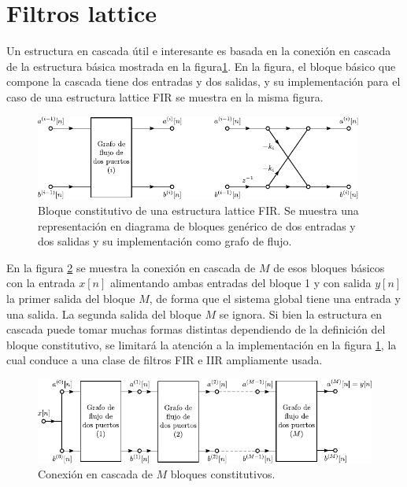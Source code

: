 \documentclass[a4paper]{report}
\begin{document}
\section{Filtros lattice}

Un estructura en cascada útil e interesante es basada en la conexión en cascada de la estructura básica mostrada en la figura\ref{fig:structures_lattice_building_blocks}. En la figura, el bloque básico que compone la cascada tiene dos entradas y dos salidas, y su implementación para el caso de una estructura lattice FIR se muestra en la misma figura.
\begin{figure}[!htb]
 \begin{center}
 \includegraphics[width=0.96\textwidth]{figuras/structures_lattice_building_blocks.pdf}
 \caption{\label{fig:structures_lattice_building_blocks} Bloque constitutivo de una estructura lattice FIR. Se muestra una representación en diagrama de bloques genérico de dos entradas y dos salidas y su implementación como grafo de flujo.}
 \end{center}
\end{figure}
En la figura \ref{fig:structures_lattice_building_blocks_connection} se muestra la conexión en cascada de \(M\) de esos bloques básicos con la entrada \(x[n]\) alimentando ambas entradas del bloque 1 y con salida \(y[n]\) la primer salida del bloque \(M\), de forma que el sistema global tiene una entrada y una salida. La segunda salida del bloque \(M\) se ignora. Si bien la estructura en cascada puede tomar muchas formas distintas dependiendo de la definición del bloque constitutivo, se limitará la atención a la implementación en la figura \ref{fig:structures_lattice_building_blocks}, la cual conduce a una clase de filtros FIR e IIR ampliamente usada.
\begin{figure}[!htb]
 \begin{center}
 \includegraphics[width=1\textwidth]{figuras/structures_lattice_building_blocks_connection.pdf}
 \caption{\label{fig:structures_lattice_building_blocks_connection} Conexión en cascada de \(M\) bloques constitutivos.}
 \end{center}
\end{figure}
\end{document}
